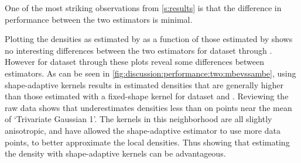 
One of the most striking observations from \cref{s:results} is that the difference in performance between the two estimators is minimal. 
	
	Plotting the densities as estimated by \sambe as a function of those estimated by \mbe shows no interesting differences between the two estimators for dataset \ferdosiOne through \baakmanFive. 
		However for dataset \ferdosiTwo through \baakmanThree these plots reveal some differences between estimators. As can be seen in \cref{fig:discussion:performance:two:mbevssambe}, using shape-adaptive kernels results in estimated densities that are generally higher than those estimated with a fixed-shape kernel for dataset \ferdosiTwo and \baakmanTwo. Reviewing the raw data shows that \sambe underestimates densities less than \mbe on points near the mean of `Trivariate Gaussian 1'. The kernels in this neighborhood are all slightly anisotropic, and have allowed the shape-adaptive estimator to use more data points, to better approximate the local densities. Thus showing that estimating the density with shape-adaptive kernels can be advantageous.
